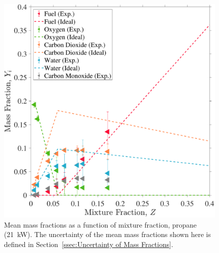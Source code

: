 \documentclass[12pt]{article}
\begin{document}
\begin{figure}[!]
	\centering
\includegraphics[width=\textwidth,keepaspectratio]{Adjusted_FuelPropane 21KW_Mixture_Fraction_Intermediate_Plot.pdf}
	\caption[Mean mass fractions as a function of mixture fraction, propane (21~kW)]{Mean mass fractions as a function of mixture fraction, propane (21~kW). The uncertainty of the mean mass fractions shown here is defined in Section~\ref{ssec:Uncertainty of Mass Fractions}.}
	\label{fig:Propane20kW_Mix_Frac}
\end{figure}
\end{document}

